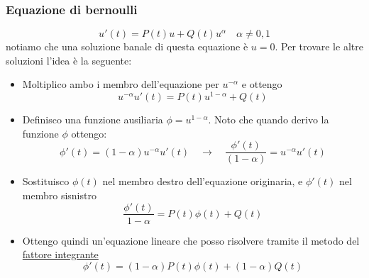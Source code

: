 \subsubsection*{Equazione di bernoulli}
\[
u'\left( t \right) = P\left( t \right) u + Q\left( t \right) u^{\alpha} \quad \alpha  \neq 0 , 1
\] 
notiamo che una soluzione banale di questa equazione è $ u=0 $. Per trovare le altre soluzioni l'idea è la seguente: 
\begin{itemize}
	\item Moltiplico ambo i membro dell'equazione per $ u^{- \alpha } $ e ottengo
	\[
	u^{-\alpha } u'\left( t \right) = P\left( t \right) u^{1-\alpha } + Q\left( t \right) 
	\] 
	\item Definisco una funzione ausiliaria $ \phi =u ^{1-\alpha } $. Noto che quando derivo la funzione $ \phi  $ ottengo: 
	\[
	\phi ' \left( t \right) = \left( 1-\alpha  \right) u^{-\alpha }u'\left( t \right)  \quad  \rightarrow \quad \frac{\phi '\left( t \right)}{\left( 1-\alpha  \right) } = u^{-\alpha  }u'\left( t \right)  
	\] 
	\item Sostituisco $ \phi \left( t \right)  $ nel membro destro dell'equazione originaria, e $ \phi ' \left( t \right)  $ nel membro sisnistro 
	\[
	\frac{\phi '\left( t \right) }{1-\alpha }=P\left( t \right) \phi \left( t \right) + Q\left( t \right) 
	\] 
	\item Ottengo quindi un'equazione lineare che posso risolvere tramite il metodo del \underline{fattore integrante}
	\[
	\phi '\left( t \right) =  \left( 1-\alpha  \right)  P\left( t \right) \phi \left( t \right) + \left( 1-\alpha  \right) Q\left( t \right) 
	\] 
\end{itemize}



